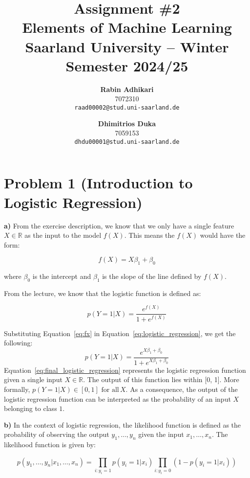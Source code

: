 \documentclass{article}
\title{Assignment \#2\\
  \vspace{2mm}
  \small{Elements of Machine Learning}
  \\
  \vspace{2mm}
  \small{Saarland University -- Winter Semester 2024/25}
}
\author{%
\textbf{Rabin Adhikari} \\
  7072310 \\
  \texttt{raad00002@stud.uni-saarland.de} \\
  \and
  \textbf{Dhimitrios Duka} \\
 7059153 \\
  \texttt{dhdu00001@stud.uni-saarland.de} \\
}
\begin{document}
\maketitle

\section*{Problem 1 (Introduction to Logistic Regression)}
\textbf{a)} From the exercise description, we know that we only have a single feature $X \in \mathbb{R}$ as the input to the model $f(X)$. This means the $f(X)$ would have the form: 

\begin{equation}
  f(X) = X\beta_1 + \beta_0
  \label{eq:fx}
\end{equation}

where \( \beta_0 \) is the intercept and \( \beta_1 \) is the slope of the line defined by $f(X)$.

From the lecture, we know that the logistic function is defined as:

\begin{equation}
  p(Y = 1 | X) = \frac{e^{f(X)}}{1 + e^{f(X)}}
  \label{eq:logistic_regression}
\end{equation}

Substituting Equation~\ref{eq:fx} in Equation~\ref{eq:logistic_regression}, we get the following:
\begin{equation}
  p(Y = 1 | X) = \frac{e^{X\beta_1 + \beta_0}}{1 + e^{X\beta_1 + \beta_0}}
  \label{eq:final_logistic_regression}
\end{equation}
Equation~\ref{eq:final_logistic_regression} represents the logistic regression function given a single input $X \in \mathbb{R}$. The output of this function lies within [0, 1]. More formally, $p(Y = 1 | X) \in [0, 1] \text{ for all} \, X$. As a consequence, the output of the logistic regression function can be interpreted as the probability of an input $X$ belonging to class $1$.

\textbf{b)} In the context of logistic regression, the likelihood function is defined as the probability of observing the output $y_1, \hdots, y_n$ given the input $x_1, \hdots, x_n$. The likelihood function is given by:

\begin{equation}
  p(y_1, \hdots, y_n | x_1, \hdots, x_n) = \prod_{i:y_i = 1}^{} p(y_i = 1 | x_i)\prod_{i:y_i = 0}^{} (1 - p(y_i = 1 | x_i))
  \label{eq:likelihood}
\end{equation}
\end{document}
